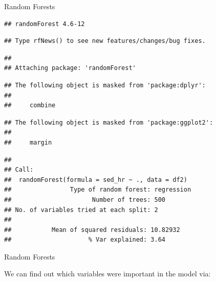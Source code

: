 \begin{frame}[fragile]{Random Forests}

\tiny

\begin{verbatim}
## randomForest 4.6-12
\end{verbatim}

\begin{verbatim}
## Type rfNews() to see new features/changes/bug fixes.
\end{verbatim}

\begin{verbatim}
## 
## Attaching package: 'randomForest'
\end{verbatim}

\begin{verbatim}
## The following object is masked from 'package:dplyr':
## 
##     combine
\end{verbatim}

\begin{verbatim}
## The following object is masked from 'package:ggplot2':
## 
##     margin
\end{verbatim}

\begin{verbatim}
## 
## Call:
##  randomForest(formula = sed_hr ~ ., data = df2) 
##                Type of random forest: regression
##                      Number of trees: 500
## No. of variables tried at each split: 2
## 
##           Mean of squared residuals: 10.82932
##                     % Var explained: 3.64
\end{verbatim}

\end{frame}

\begin{frame}[fragile]{Random Forests}

We can find out which variables were important in the model via:

\begin{Shaded}
\begin{Highlighting}[]
\NormalTok{(}\NormalTok{(}\NormalTok{,}
\end{Highlighting}
\end{Shaded}

\end{frame}

